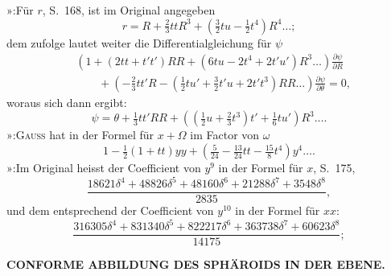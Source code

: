 {\noindent »\quad [17]:\quad Für \(r\), S.\ 168, ist im Original angegeben
\[
r=R+\tfrac23ttR^3+(\tfrac32tu-\tfrac12t^4)R^4\ldots;
\]
\noindent dem zufolge lautet weiter die Differentialgleichung für \(\psi\)
\[
\begin{aligned}
&\left(1+(2tt+t't')RR+(6tu-2t^4+2t'u')R^3\ldots\right)
 \frac{\partial\psi}{\partial R}\\
&\qquad+\left(-\tfrac23tt'R-(\tfrac12tu'+\tfrac32t'u+2t't^3)RR\ldots\right)
 \frac{\partial\psi}{\partial\theta}=0,
\end{aligned}
\]
\noindent woraus sich dann ergibt:
\[
\psi=\theta+\tfrac13tt'RR+\left((\tfrac12u+\tfrac23t^3)t'+\tfrac16tu'\right)R^3\ldots.
\]
\noindent »\quad [20]:\quad \textsc{Gauss} hat in der Formel für \(x+\Omega\) im Factor von \(\omega\)
\[
1-\tfrac12(1+tt)yy+(\tfrac5{24}-\tfrac{13}{24}tt-\tfrac{15}8t^4)y^4\ldots.
\]
\noindent »\quad [23]:\quad Im Original heisst der Coefficient von \(y^9\) in der Formel für \(x\), S.\ 175,
\[
\frac{18621\delta^4+48826\delta^5+48160\delta^6+21288\delta^7+3548\delta^8}{2835},
\]
\noindent und dem entsprechend der Coefficient von \(y^{10}\) in der Formel für \(xx\):
\[
\frac{316305\delta^4+831340\delta^5+822217\delta^6+363738\delta^7+60623\delta^8}{14175};
\]
\par}

\par\clearpage
\noindent\null\hfill{\small\textbf{CONFORME ABBILDUNG DES SPHÄROIDS IN DER EBENE.}}\hfill{}\par\medskip

